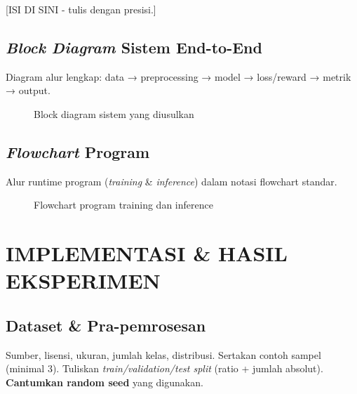\documentclass[11pt,a4paper,oneside]{report}
\begin{document}
[ISI DI SINI - tulis dengan presisi.]

\section{\textit{Block Diagram} Sistem End-to-End}
\begin{petunjuk}
Diagram alur lengkap: data → preprocessing → model → loss/reward → metrik → output.
\end{petunjuk}

\begin{figure}[h!]
\centering
{}
\caption{Block diagram sistem yang diusulkan}
\label{fig:block-diagram}
\end{figure}

\section{\textit{Flowchart} Program}
\begin{petunjuk}
Alur runtime program (\textit{training} \& \textit{inference}) dalam notasi flowchart standar.
\end{petunjuk}

\begin{figure}[h!]
\centering
{}
\caption{Flowchart program training dan inference}
\label{fig:flowchart}
\end{figure}

\chapter{IMPLEMENTASI \& HASIL EKSPERIMEN}
\label{bab:implementasi}

\section{Dataset \& Pra-pemrosesan}
\begin{petunjuk}
Sumber, lisensi, ukuran, jumlah kelas, distribusi. Sertakan contoh sampel (minimal 3). Tuliskan \textit{train/validation/test split} (ratio + jumlah absolut). \textbf{Cantumkan random seed} yang digunakan.
\end{petunjuk}
\end{document}
